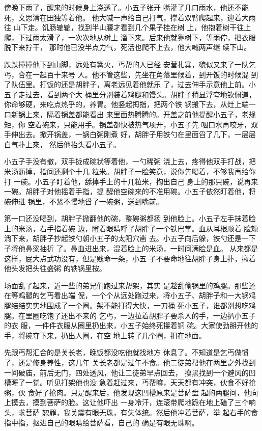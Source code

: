 傍晚下雨了，醒来的时候身上浇透了。小五子张开
嘴灌了几口雨水，他还不能死，文思清在田独等着他。
他大喊一声给自己打气，撑着双臂爬起来，迎着大雨往
山下走。饥肠辘辘，找到半山腰才看到几个果子挂在树
上，他抱着树干往上爬，下过雨太滑了，一次次地从树上
溜下来。后来他就靠树下，等雨停，把衣服脱下来拧干，
那时他已没半点力气，死活也爬不上去，他大喊两声继
续下山。

跌跌撞撞他下到山脚，远处有篝火，丐帮的人已经
安营扎寨，貌似又来了一队乞丐，合在一起百十来号
人。他不管这些，先坐在角落里候着，到开饭的时候混
到了队伍里。打饭的还是胡胖子，离老远见着他就乐
了，过去伸手示意他上前。小五子走过去，看到两个大
桶里分别装着鸡腿和馒头。胡胖子稍显浮夸地钦佩道，
你命够硬，来吃点热乎的，养胃。他竖起拇指，把两个铁
锅搬下去，从灶上端一口新锅上来，隔着锅盖都能看出
来里面热腾腾的。开盖之前他提醒小五子，老规矩，你
空着碗来，只能用手。锅盖都快被热气项开，小五子先
咽口水再咬牙，双手伸出去。掀开锅盖，一锅白粥刚煮
好，胡胖子用铁勺在里面舀了几下，一层层白气扑上來，
然后他抬头看小五子。

小五子手没有撤，双手拢成碗状等着他，一勺稀粥
浇上去，疼得他双手打战，把米汤沥掉，指间还剩个十几
粒米。胡胖子一脸笑意，说你先喝着，不够我再给你打
一碗。小五子盯着他，舔掉手上的十几粒米，掏出自己
身上的那只碗，说再来一碗。胡胖子对他摇着手指，提
醒他空碗来的不准用碗。小五子依然盯着他，将碗伸进
锅里，不紧不慢地舀了一碗粥，送到嘴前。

第一口还没喝到，胡胖子掀翻他的碗，整碗粥都扬
到他脸上。小五子左手抹着脸上的米汤，右手掐着碗
边，瞪着眼睛呼了胡胖子一个铁巴掌。血从耳根顺着
脸颊淌下来，胡胖子抄起铁勺朝小五子的太阳穴凿
去。小五子向后躲，铁勺还是一下子将他鼻梁抽折
了。鼻血进出来，混着脸上的米汤，一时间满脸是血。
从来都是这样，屁大点武功没有，但是贱命一条，小五
子不要命地往胡胖子身上扑，揪着他头发把头往盛粥
的铁锅里按。

场面乱了起来，近一些的弟兄们跑过来帮架，其实
是趁乱偷锅里的鸡腿。那些还在等鸡腿的乞丐看出端
倪，一个个从远处跑过来，将小五子、胡胖子和一大锅鸡
腿结结实实地围成了一个圈。架不能打得大快，一刀捅
死小五子，谁都别想吃鸡腿。在里圈吃饱了还出不来的
乞丐，一边拉着胡胖子要杀人的手，一边扒小五子的衣
服，一件件衣服从圈里扔出来，小五子始终死攥着铜
碗。大家使劲掰开他的手，将碗夺下来，扔出人圈，在空
地上转了几个圈，扣在地面。

先跟丐帮汇合的是关长老，晚饭都没吃他就找地方
休息了。不知道是乞丐做惯了，还是修身养性，这几年
关长老都是过午不食。他二徒弟帮他在两里之外找到
一间破庙，前后无门，四处透风，他让二徒弟早点回去，
摸黑找到一个避风的凹槽睡了一觉。听见打架他也没
急着赶过来，丐帮嘛，天天都有冲突，伙食不好抢粥，伙
食好了抢肉。只是醒来后，他发现这凹槽原来是菩萨盘
起的两腿间，他向上摸去，摸到菩萨的脸。这让他吓出
一身冷汗，连滚带爬地跪在地上磕了三个响头，求菩萨
恕罪，我关震有眼无珠，有失体统。然后他冲着菩萨，举
起右手的食指中指，抠进自己的眼睛给菩萨看，自己的
确是有眼无珠啊。


